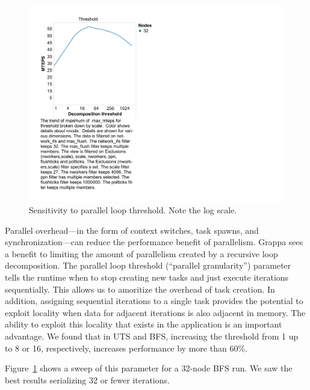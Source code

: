 \begin{figure}[htb]
\begin{center}
  \includegraphics[width=0.95\columnwidth]{figs/bfs_sweep_threshold}
\begin{minipage}{0.95\columnwidth}
  \caption{\label{fig:bfs-sweep-threshold} Sensitivity to parallel loop threshold. Note the log scale.}
\end{minipage}
\vspace{-3ex}
\end{center}
\end{figure}

Parallel overhead---in the form of context switches, task spawns, and
synchronization---can reduce the performance benefit of parallelism.
Grappa sees a benefit to limiting the amount of parallelism created by
a recursive loop decomposition. The parallel loop threshold (``parallel
granularity'') parameter tells the runtime when to stop creating new tasks and just execute iterations
sequentially. This allows us to amoritize the overhead of task
creation. In addition, assigning sequential iterations to a single
task provides the potential to exploit locality when data for adjacent iterations is
also adjacent in memory. The ability to exploit this locality that
exists in the application is an important advantage. We found that in UTS and BFS, increasing the
threshold from 1 up to 8 or 16, respectively, increases performance by
more than 60\%.

Figure~\ref{fig:bfs-sweep-threshold} shows a sweep of this parameter
for a 32-node BFS run. We saw the best results serializing 32 or fewer
iterations.


